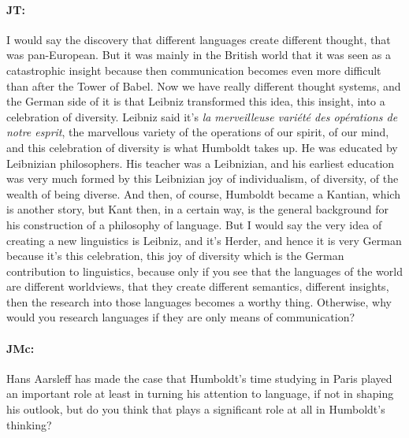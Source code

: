 \documentclass[output=paper]{langscibook}
\begin{document}
\paragraph*{JT:} I would say the discovery that different languages create different thought, that was pan-European. But it was mainly in the British world that it was seen as a catastrophic insight because then communication becomes even more difficult than after the Tower of Babel. Now we have really different thought systems, and the German side of it is that Leibniz transformed this idea, this insight, into a celebration of diversity. Leibniz said it’s \textit{la merveilleuse variété des opérations de notre esprit}, the marvellous variety of the operations of our spirit, of our mind, and this celebration of diversity is what Humboldt takes up. He was educated by Leibnizian philosophers. His teacher was a Leibnizian, and his earliest education was very much formed by this Leibnizian joy of individualism, of diversity, of the wealth of being diverse. And then, of course, Humboldt became a Kantian, which is another story, but Kant then, in a certain way, is the general background for his construction of a philosophy of language. But I would say the very idea of creating a new linguistics is Leibniz, and it’s Herder, and hence it is very German because it’s this celebration, this joy of diversity which is the German contribution to linguistics, because only if you see that the languages of the world are different worldviews, that they create different semantics, different insights, then the research into those languages becomes a worthy thing. Otherwise, why would you research languages if they are only means of communication?


\paragraph*{JMc:} Hans Aarsleff has made the case that Humboldt’s time studying in Paris played an important role at least in turning his attention to language, if not in shaping his outlook, but do you think that plays a significant role at all in Humboldt’s thinking?
\end{document}
